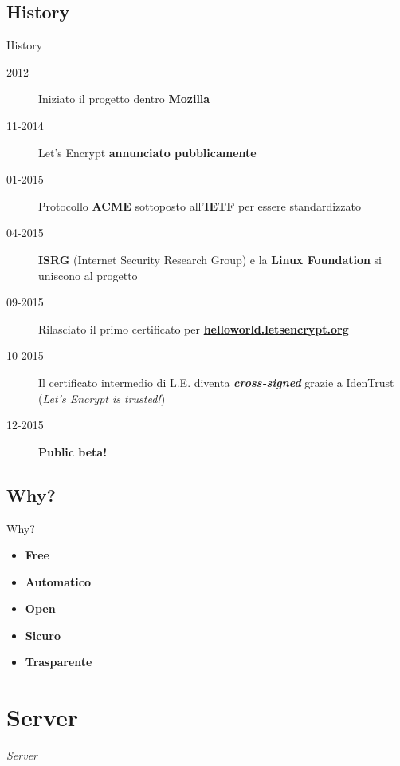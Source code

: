 \documentclass[xcolor=svgnames,11pt]{beamer}
\begin{document}
\subsection{History}
\begin{frame}{History}
\begin{description}
  \item[2012] Iniziato il progetto dentro \textbf{Mozilla}
  \pause
  \item[11-2014] Let's Encrypt \textbf{annunciato pubblicamente}
  \pause
  \item[01-2015] Protocollo \textbf{ACME} sottoposto all'\textbf{IETF} per essere standardizzato
  \pause
  \item[04-2015] \textbf{ISRG} (Internet Security Research Group) e la \textbf{Linux Foundation}
  si uniscono al progetto
  \pause
  \item[09-2015] Rilasciato il primo certificato per \textbf{\href{https://helloworld.letsencrypt.org/}{helloworld.letsencrypt.org}}
  \pause
  \item[10-2015] Il certificato intermedio di L.E. diventa \textbf{\emph{cross-signed}} grazie a IdenTrust 
  (\emph{Let's Encrypt is trusted!})
  \pause
  \item[12-2015] \textbf{Public beta!}
\end{description}
\end{frame}

\subsection{Why?}
\begin{frame}{Why?}
\begin{itemize}
  \item \textbf{Free}
  \medskip\pause
  \item \textbf{Automatico}
  \medskip\pause
  \item \textbf{Open}
  \medskip\pause
  \item \textbf{Sicuro}
  \medskip\pause
  \item \textbf{Trasparente}
\end{itemize}
\end{frame}

\section{Server}
\begin{frame}{}
\begin{center}
\begin{Huge}
\textcolor{leorange}{\emph{Server}}
\end{Huge}
\end{center}
\end{frame}
\end{document}
